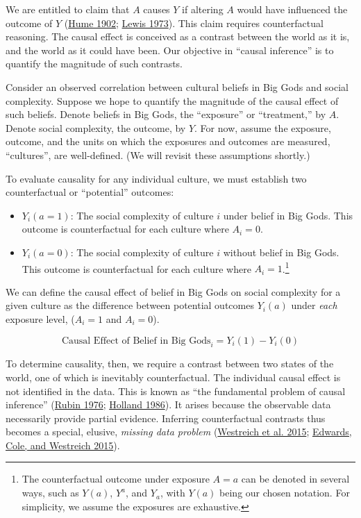 \documentclass[
  singlecolumn]{article}
\providecommand{\tightlist}{%
  \setlength{\itemsep}{0pt}\setlength{\parskip}{0pt}}\usepackage{longtable,booktabs,array}
\begin{document}
We are entitled to claim that \(A\) causes \(Y\) if altering \(A\) would
have influenced the outcome of \(Y\)
(\protect\hyperlink{ref-hume1902}{Hume 1902};
\protect\hyperlink{ref-lewis1973}{Lewis 1973}). This claim requires
counterfactual reasoning. The causal effect is conceived as a contrast
between the world as it is, and the world as it could have been. Our
objective in ``causal inference'' is to quantify the magnitude of such
contrasts.

Consider an observed correlation between cultural beliefs in Big Gods
and social complexity. Suppose we hope to quantify the magnitude of the
causal effect of such beliefs. Denote beliefs in Big Gods, the
``exposure'' or ``treatment,'' by \(A\). Denote social complexity, the
outcome, by \(Y\). For now, assume the exposure, outcome, and the units
on which the exposures and outcomes are measured, ``cultures'', are
well-defined. (We will revisit these assumptions shortly.)

To evaluate causality for any individual culture, we must establish two
counterfactual or ``potential'' outcomes:

\begin{itemize}
\tightlist
\item
  \(Y_i(a = 1)\): The social complexity of culture \(i\) under belief in
  Big Gods. This outcome is counterfactual for each culture where
  \(A_i = 0\).
\item
  \(Y_i(a = 0)\): The social complexity of culture \(i\) without belief
  in Big Gods. This outcome is counterfactual for each culture where
  \(A_i = 1\).\footnote{The counterfactual outcome under exposure
    \(A = a\) can be denoted in several ways, such as \(Y(a)\),
    \(Y^{a}\), and \(Y_a\), with \(Y(a)\) being our chosen notation. For
    simplicity, we assume the exposures are exhaustive.}
\end{itemize}

We can define the causal effect of belief in Big Gods on social
complexity for a given culture as the difference between potential
outcomes \(Y_i(a)\) under \emph{each} exposure level, (\(A_i = 1\) and
\(A_i = 0\)).

\[
\text{Causal Effect of Belief in Big Gods}_i = Y_i(1) - Y_i(0) 
\]

To determine causality, then, we require a contrast between two states
of the world, one of which is inevitably counterfactual. The individual
causal effect is not identified in the data. This is known as ``the
fundamental problem of causal inference''
(\protect\hyperlink{ref-rubin1976}{Rubin 1976};
\protect\hyperlink{ref-holland1986}{Holland 1986}). It arises because
the observable data necessarily provide partial evidence. Inferring
counterfactual contrasts thus becomes a special, elusive, \emph{missing
data problem} (\protect\hyperlink{ref-westreich2015}{Westreich et al.
2015}; \protect\hyperlink{ref-edwards2015}{Edwards, Cole, and Westreich
2015}).
\end{document}
